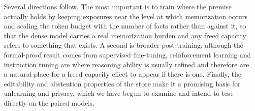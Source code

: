 \documentclass{article}
\begin{document}
Several directions follow. The most important is to train where the premise actually holds by keeping exposures near the level at which memorization occurs and scaling the token budget with the number of facts rather than against it, so that the dense model carries a real memorization burden and any freed capacity refers to something that exists. A second is broader post-training: although the formal-proof result comes from supervised fine-tuning, reinforcement learning and instruction tuning are where reasoning ability is usually refined and therefore are a natural place for a freed-capacity effect to appear if there is one. Finally, the editability and abstention properties of the store make it a promising basis for unlearning and privacy, which we have begun to examine and intend to test directly on the paired models.


\FloatBarrier
  

\end{document}
